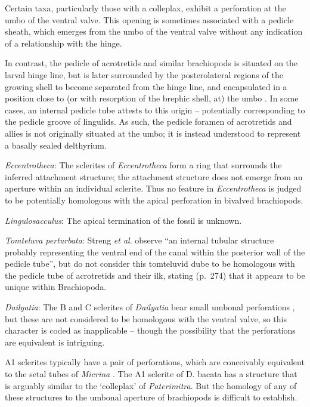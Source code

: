 \documentclass[]{book}
\theoremstyle{definition}
\theoremstyle{definition}
\theoremstyle{definition}
\theoremstyle{remark}
\begin{document}
Certain taxa, particularly those with a colleplax, exhibit a perforation
at the umbo of the ventral valve. This opening is sometimes associated
with a pedicle sheath, which emerges from the umbo of the ventral valve
without any indication of a relationship with the hinge.

In contrast, the pedicle of acrotretids and similar brachiopods is
situated on the larval hinge line, but is later surrounded by the
posterolateral regions of the growing shell to become separated from the
hinge line, and encapsulated in a position close to (or with resorption
of the brephic shell, at) the umbo \citep[see][pp.~407--411 and fig. 3
for discussion]{Popov1992TheCambrian}. In some cases, an internal
pedicle tube attests to this origin -- potentially corresponding to the
pedicle groove of lingulids. As such, the pedicle foramen of acrotretids
and allies is not originally situated at the umbo; it is instead
understood to represent a basally sealed delthyrium.

\emph{Eccentrotheca}: The sclerites of \emph{Eccentrotheca} form a ring
that surrounds the inferred attachment structure; the attachment
structure does not emerge from an aperture within an individual
sclerite. Thus no feature in \emph{Eccentrotheca} is judged to be
potentially homologous with the apical perforation in bivalved
brachiopods.

\emph{Lingulosacculus}: The apical termination of the fossil is unknown.

\emph{Tomteluva perturbata}: Streng \emph{et al}.
\citeyearpar{Streng2016Anew} observe ``an internal tubular structure
probably representing the ventral end of the canal within the posterior
wall of the pedicle tube'', but do not consider this tomteluvid dube to
be homologous with the pedicle tube of acrotretids and their ilk,
stating (p.~274) that it appears to be unique within Brachiopoda.

\emph{Dailyatia}: The B and C sclerites of \emph{Dailyatia} bear small
umbonal perforations \citep{Skovsted2015Theearly}, but these are not
considered to be homologous with the ventral valve, so this character is
coded as inapplicable -- though the possibility that the perforations
are equivalent is intriguing.

A1 sclerites typically have a pair of perforations, which are
conceivably equivalent to the setal tubes of \emph{Micrina}
\citep{Holmer2011Firstrecord}. The A1 sclerite of D. bacata has a
structure that is arguably similar to the `colleplax' of
\emph{Paterimitra}. But the homology of any of these structures to the
umbonal aperture of brachiopods is difficult to establish.
\end{document}
